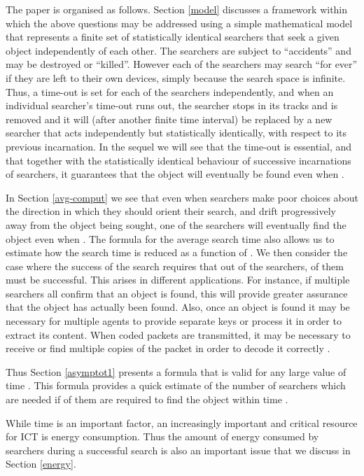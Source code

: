 \documentclass[journal]{IEEEtran}
\begin{document}
The paper is organised as follows. Section \ref{model} discusses a framework within which the above questions may be addressed using a simple mathematical model that represents a finite set of  statistically identical searchers that seek a given object independently of each other. The  searchers are subject to ``accidents''  and
may be destroyed or ``killed''. However each of the searchers may search  ``for ever'' if they are left to their own devices, simply because the search space is infinite. Thus, a time-out is set for each of the searchers independently, and when an individual searcher's time-out runs out, the searcher
stops in its tracks and is removed and it will
(after another finite time interval) be replaced by a new searcher that acts independently but statistically identically, with respect to its previous incarnation. In the sequel we will see that the time-out is essential, and that together with the statistically identical behaviour of successive incarnations of searchers, it guarantees that the object will eventually be found even when .


In Section \ref{avg-comput} we  see that even when searchers make poor choices
about the direction in which they should orient their search, and
drift progressively away from the object being sought, one of the searchers will eventually find the object even when . The formula for the average search time also allows us to estimate how the search time is reduced as a function of .
We then consider the case where the success of the search requires that out of the  searchers,  of them must be successful.
This arises in different applications. For instance,  if multiple searchers all confirm that an object is found, this will provide greater assurance that the object  has actually been found. Also, once an object is found it may be necessary for multiple agents to provide separate keys
or process it in order to extract its content.
When coded packets are transmitted, it may be necessary to receive or find multiple copies of the
packet in order to decode it correctly \cite{Wang05}.

Thus Section \ref{asymptot1} presents a
formula that is valid for any large value of time . This formula provides a quick estimate of the number  of searchers which are needed if  of them
are required to find the object within time .

While time is an important factor, an increasingly important  and critical resource for ICT  is energy consumption. Thus the amount
of energy consumed by  searchers during a successful search is also an important issue that we discuss in Section \ref{energy}.
\end{document}
